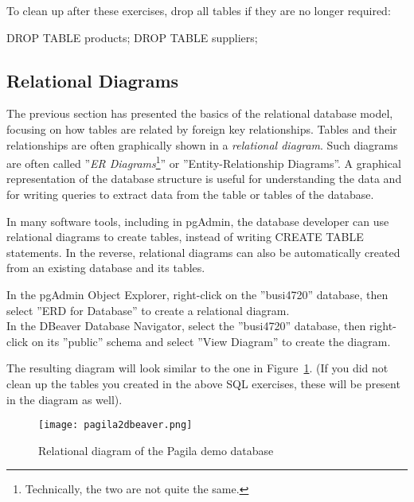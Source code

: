 \noindent To clean up after these exercises, drop all tables if they are no longer required:

\begin{sqlcode}
DROP TABLE products;
DROP TABLE suppliers;
\end{sqlcode}

\subsection*{Relational Diagrams}

The previous section has presented the basics of the relational database model, focusing on how tables are related by foreign key relationships. Tables and their relationships are often graphically shown in a \emph{relational diagram}. Such diagrams are often called ''\emph{ER Diagrams}\footnote{Technically, the two are not quite the same.}'' or ''Entity-Relationship Diagrams''. A graphical representation of the database structure is useful for understanding the data and for writing queries to extract data from the table or tables of the database. 

In many software tools, including in pgAdmin, the database developer can use relational diagrams to create tables, instead of writing CREATE TABLE statements. In the reverse, relational diagrams can also be automatically created from an existing database and its tables. 

\begin{exercisebox}In the pgAdmin Object Explorer, right-click on the ''busi4720'' database, then select ''ERD for Database'' to create a relational diagram. \\

In the DBeaver Database Navigator, select the ''busi4720'' database, then right-click on its ''public'' schema and select ''View Diagram'' to create the diagram.
\end{exercisebox}

\noindent The resulting diagram will look similar to the one in Figure~\ref{fig:pagila}. (If you did not clean up the tables you created in the above SQL exercises, these will be present in the diagram as well).

\begin{figure}
\centering

\texttt{[image: pagila2dbeaver.png]}
\caption{Relational diagram of the Pagila demo database}
\label{fig:pagila}
\end{figure}


